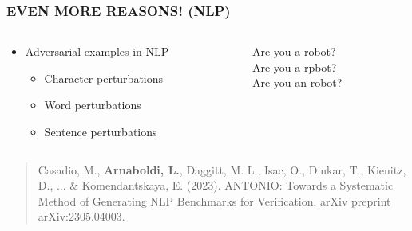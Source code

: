 \documentclass[t,compress,aspectratio=169]{beamer}
\begin{document}
\begin{frame}
\frametitle{EVEN MORE REASONS! (NLP)}

\begin{columns}[c]
    \begin{column}{.5\textwidth}    \Large

        \begin{itemize}
            \item Adversarial examples in NLP
            \begin{itemize}    \Large

                \item \textcolor{aisecred}{Character perturbations}
                \item Word perturbations
                \item Sentence perturbations
            \end{itemize}
        \end{itemize}
    \end{column}
    \begin{column}{.5\textwidth}
    \begin{center}    \Large

        \textcolor{aisecpurple}{Are you a robot?}\\
        \textcolor{aisecpurple}{Are you a r}\textcolor{aisecred}{p}\textcolor{aisecpurple}{bot?}\\
        \textcolor{aisecpurple}{Are you a}\textcolor{aisecred}{n }\textcolor{aisecpurple}{robot?}
    \end{center}
    \end{column}
\end{columns}
\vfill
	\begin{quote}
		\tiny Casadio, M., \textbf{\textbf{Arnaboldi, L.}}, Daggitt, M. L., Isac, O., Dinkar, T., Kienitz, D., ... \& Komendantskaya, E. (2023). ANTONIO: Towards a Systematic Method of Generating NLP Benchmarks for Verification. arXiv preprint arXiv:2305.04003.
		
	\end{quote}
\end{frame}
\end{document}

